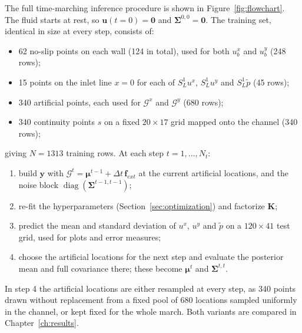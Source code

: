 \documentclass[11pt, a4paper]{report}
\begin{document}
The full time-marching inference procedure is shown in Figure~\ref{fig:flowchart}.
The fluid starts at rest, so \(\boldsymbol{u}(t=0) = \boldsymbol{0}\) and \(\boldsymbol{\Sigma}^{0,0} = \boldsymbol{0}\).
The training set, identical in size at every step, consists of:
\begin{itemize}
    \item 62 no-slip points on each wall (124 in total), used for both \(u_b^x\) and \(u_b^y\) (248 rows);
    \item 15 points on the inlet line \(x = 0\) for each of \(S^1_L u^x\), \(S^1_L u^y\) and \(S^1_L \tilde{p}\) (45 rows);
    \item 340 artificial points, each used for \(\mathcal{G}^x\) and \(\mathcal{G}^y\) (680 rows);
    \item 340 continuity points \(s\) on a fixed \(20 \times 17\) grid mapped onto the channel (340 rows);
\end{itemize}
\noindent giving \(N = 1313\) training rows. At each step \(t = 1, \dots, N_t\):
\begin{enumerate}
    \item build \(\boldsymbol{y}\) with \(\mathcal{G}^t = \boldsymbol{\mu}^{t-1} + \Delta t\,\boldsymbol{f}_{ext}\) at the current
          artificial locations, and the noise block \(\operatorname{diag}(\boldsymbol{\Sigma}^{t-1,t-1})\);
    \item re-fit the hyperparameters (Section~\ref{sec:optimization}) and factorize \(\boldsymbol{K}\);
    \item predict the mean and standard deviation of \(u^x\), \(u^y\) and \(\tilde{p}\) on a
          \(120 \times 41\) test grid, used for plots and error measures;
    \item choose the artificial locations for the next step and evaluate the posterior mean and full
          covariance there; these become \(\boldsymbol{\mu}^{t}\) and \(\boldsymbol{\Sigma}^{t,t}\).
\end{enumerate}
In step 4 the artificial locations are either resampled at every step, as 340 points
drawn without replacement from a fixed pool of 680 locations sampled uniformly in the
channel, or kept fixed for the whole march. Both variants are compared in
Chapter~\ref{ch:results}.
\end{document}
